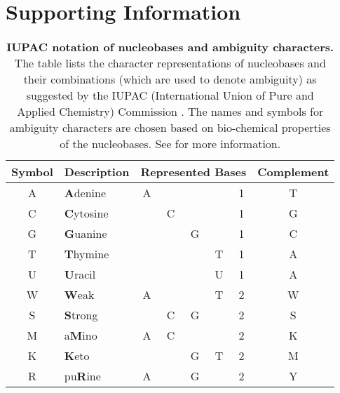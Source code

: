 
\chapter{Supporting Information}
\label{ch:SupportingInformation}

\begin{table}[htbp]
\caption[IUPAC notation of nucleobases and ambiguity characters]{
\textbf{IUPAC notation of nucleobases and ambiguity characters.}
The table lists the character representations of nucleobases and their combinations (which are used to denote ambiguity)
as suggested by the IUPAC (International Union of Pure and Applied Chemistry) Commission \cite{IUPAC1970}.
The names and symbols for ambiguity characters are chosen based on bio-chemical properties of the nucleobases.
See  for more information.
}
\label{tab:AmbiguityCharacters}
{
    \newcommand{\mc}[3]{\multicolumn{#1}{#2}{#3}}
    \newcommand{\rb}{\cellcolor{black!12}}
    \begin{center}
    \begin{tabular}{c|l|cccc|c|c}
    \hline
    Symbol & Description & \mc{5}{c|}{Represented Bases} & Complement \\
    \hline
    A & \textbf{A}denine & \rb{} A &  &  &  & 1 & T \\
    C & \textbf{C}ytosine &  & \rb{} C &  &  & 1 & G \\
    G & \textbf{G}uanine &  &  & \rb{} G &  & 1 & C \\
    T & \textbf{T}hymine &  &  &  & \rb{} T & 1 & A \\
    U & \textbf{U}racil &  &  &  & \rb{} U & 1 & A \\
    \hline
    W & \textbf{W}eak & \rb{} A &  &  & \rb{} T & 2 & W \\
    S & \textbf{S}trong &  & \rb{} C & \rb{} G &  & 2 & S \\
    M & a\textbf{M}ino & \rb{} A & \rb{} C &  &  & 2 & K \\
    K & \textbf{K}eto &  &  & \rb{} G & \rb{} T & 2 & M \\
    R & pu\textbf{R}ine & \rb{} A &  & \rb{} G &  & 2 & Y \\

\end{tabular}
\end{center}}
\end{table}
